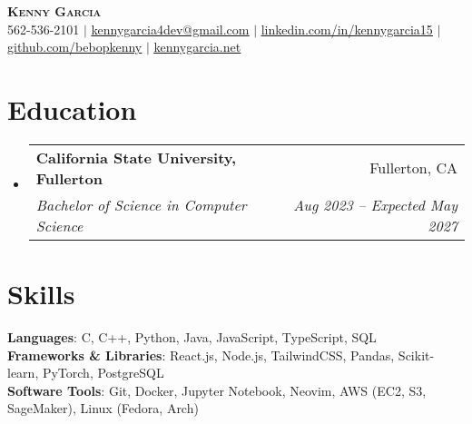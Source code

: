 \documentclass[letterpaper,11pt]{article}
\makeatletter
\newcommand{\resumeSubheading}[4]{
  \vspace{-2pt}\item
    \begin{tabular*}{0.97\textwidth}[t]{l@{\extracolsep{\fill}}r}
      \textbf{#1} & #2 \\
      \textit{\small#3} & \textit{\small #4} \\
    \end{tabular*}\vspace{-7pt}
}
\newcommand{\resumeSubHeadingListStart}{\begin{itemize}[leftmargin=0.15in, label={}]}
\newcommand{\resumeSubHeadingListEnd}{\end{itemize}}
\makeatother
\begin{document}

\begin{center}
    \textbf{\Huge \scshape Kenny Garcia} \\ \vspace{1pt}
    \small 562-536-2101 $|$ \href{https://www.kennygarcia4dev@gmail.com}{\underline{kennygarcia4dev@gmail.com}} $|$ 
    \href{https://linkedin.com/in/kennygarcia15}{\underline{linkedin.com/in/kennygarcia15}} $|$
    \href{https://github.com/bebopkenny}{\underline{github.com/bebopkenny}} $|$ \href{https://kennygarcia.net}{\underline{kennygarcia.net}}
\end{center}


\section{Education}
  \resumeSubHeadingListStart
    \resumeSubheading
      {California State University, Fullerton}{Fullerton, CA}
      {Bachelor of Science in Computer Science}{Aug 2023 -- Expected May 2027}
  \resumeSubHeadingListEnd
\vspace{-8pt}


\section{Skills}
 \begin{itemize}[leftmargin=0.15in, label={}]
    \small{\item{
     \textbf{Languages}{: C, C++, Python, Java, JavaScript, TypeScript, SQL} \\
     \textbf{Frameworks \& Libraries}{: React.js, Node.js, TailwindCSS, Pandas, Scikit-learn, PyTorch, PostgreSQL} \\
     \textbf{Software Tools}{: Git, Docker, Jupyter Notebook, Neovim, AWS (EC2, S3, SageMaker), Linux (Fedora, Arch)}
    }}
 \end{itemize}
\end{document}
